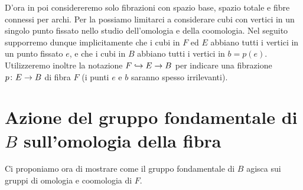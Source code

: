 D'ora in poi considereremo solo fibrazioni con spazio base, spazio totale e fibre connessi per archi. Per la  possiamo limitarci a considerare cubi con vertici in un singolo punto fissato nello studio dell'omologia e della coomologia. Nel seguito supporremo dunque implicitamente che i cubi in \(F\) ed \(E\) abbiano tutti i vertici in un punto fissato \(e\), e che i cubi in \(B\) abbiano tutti i vertici in \(b=p(e)\). Utilizzeremo inoltre la notazione \(F\hookrightarrow E\to B\) per indicare una fibrazione \(\map{p}{E}{B}\) di fibra \(F\) (i punti \(e\) e \(b\) saranno spesso irrilevanti).

\section{Azione del gruppo fondamentale di \texorpdfstring{\(B\)}{B} sull'omologia della fibra}

Ci proponiamo ora di mostrare come il gruppo fondamentale di \(B\) agisca sui gruppi di omologia e coomologia di \(F\).

